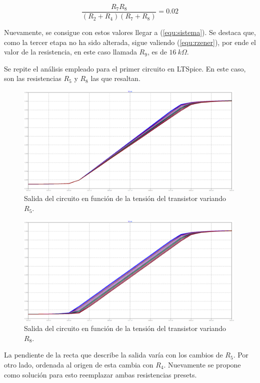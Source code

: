 \documentclass[a4paper]{article}
\begin{document}
\[
	\frac{R_7 R_8}{\left(R_2 + R_4 \right)\left(R_7 + R_8 \right)} = 0.02
\]

Nuevamente, se consigue con estos valores llegar a (\ref{equ:sistema}). Se destaca que, como la tercer etapa no ha sido alterada, sigue valiendo (\ref{equ:rzener}), por ende el valor de la resistencia, en este caso llamada $R_9$, es de $16 \ k\Omega$.

Se repite el análisis empleado para el primer circuito en LTSpice. En este caso, son las resistencias $R_5$ y $R_8$ las que resaltan.

\begin{figure}[H]
	\centering
	\includegraphics[width=0.99\textwidth]{Ejercicio6/Imagenes/StepR5-M2.png}
	\caption{Salida del circuito en función de la tensión del transistor variando $R_5$.}
	\label{fig:r5-M2}
\end{figure}

\begin{figure}[H]
	\centering
	\includegraphics[width=0.99\textwidth]{Ejercicio6/Imagenes/StepR8-M2.png}
	\caption{Salida del circuito en función de la tensión del transistor variando $R_8$.}
	\label{fig:r8-M2}
\end{figure}

La pendiente de la recta que describe la salida varía con los cambios de $R_5$. Por otro lado, ordenada al origen de esta cambia con $R_4$. Nuevamente se propone como solución para esto reemplazar ambas resistencias presets.
\end{document}
